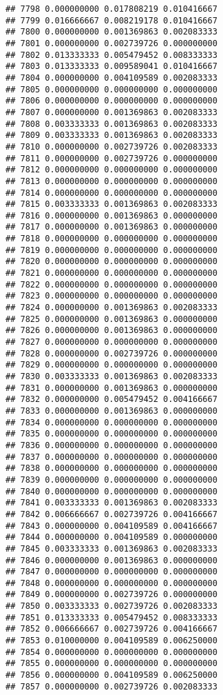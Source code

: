 \documentclass[
]{article}
\begin{document}
\begin{verbatim}
## 7798 0.000000000 0.017808219 0.010416667
## 7799 0.016666667 0.008219178 0.010416667
## 7800 0.000000000 0.001369863 0.002083333
## 7801 0.000000000 0.002739726 0.000000000
## 7802 0.013333333 0.005479452 0.008333333
## 7803 0.013333333 0.009589041 0.010416667
## 7804 0.000000000 0.004109589 0.002083333
## 7805 0.000000000 0.000000000 0.000000000
## 7806 0.000000000 0.000000000 0.000000000
## 7807 0.000000000 0.001369863 0.002083333
## 7808 0.003333333 0.001369863 0.002083333
## 7809 0.003333333 0.001369863 0.002083333
## 7810 0.000000000 0.002739726 0.002083333
## 7811 0.000000000 0.002739726 0.000000000
## 7812 0.000000000 0.000000000 0.000000000
## 7813 0.000000000 0.000000000 0.000000000
## 7814 0.000000000 0.000000000 0.000000000
## 7815 0.003333333 0.001369863 0.002083333
## 7816 0.000000000 0.001369863 0.000000000
## 7817 0.000000000 0.001369863 0.000000000
## 7818 0.000000000 0.000000000 0.000000000
## 7819 0.000000000 0.000000000 0.000000000
## 7820 0.000000000 0.000000000 0.000000000
## 7821 0.000000000 0.000000000 0.000000000
## 7822 0.000000000 0.000000000 0.000000000
## 7823 0.000000000 0.000000000 0.000000000
## 7824 0.000000000 0.001369863 0.002083333
## 7825 0.000000000 0.001369863 0.000000000
## 7826 0.000000000 0.001369863 0.000000000
## 7827 0.000000000 0.000000000 0.000000000
## 7828 0.000000000 0.002739726 0.000000000
## 7829 0.000000000 0.000000000 0.000000000
## 7830 0.003333333 0.001369863 0.002083333
## 7831 0.000000000 0.001369863 0.000000000
## 7832 0.000000000 0.005479452 0.004166667
## 7833 0.000000000 0.001369863 0.000000000
## 7834 0.000000000 0.000000000 0.000000000
## 7835 0.000000000 0.000000000 0.000000000
## 7836 0.000000000 0.000000000 0.000000000
## 7837 0.000000000 0.000000000 0.000000000
## 7838 0.000000000 0.000000000 0.000000000
## 7839 0.000000000 0.000000000 0.000000000
## 7840 0.000000000 0.000000000 0.000000000
## 7841 0.003333333 0.001369863 0.002083333
## 7842 0.006666667 0.002739726 0.004166667
## 7843 0.000000000 0.004109589 0.004166667
## 7844 0.000000000 0.004109589 0.000000000
## 7845 0.003333333 0.001369863 0.002083333
## 7846 0.000000000 0.001369863 0.000000000
## 7847 0.000000000 0.000000000 0.000000000
## 7848 0.000000000 0.000000000 0.000000000
## 7849 0.000000000 0.002739726 0.000000000
## 7850 0.003333333 0.002739726 0.002083333
## 7851 0.013333333 0.005479452 0.008333333
## 7852 0.006666667 0.002739726 0.004166667
## 7853 0.010000000 0.004109589 0.006250000
## 7854 0.000000000 0.000000000 0.000000000
## 7855 0.000000000 0.000000000 0.000000000
## 7856 0.000000000 0.004109589 0.006250000
## 7857 0.000000000 0.002739726 0.002083333

\end{verbatim}
\end{document}
